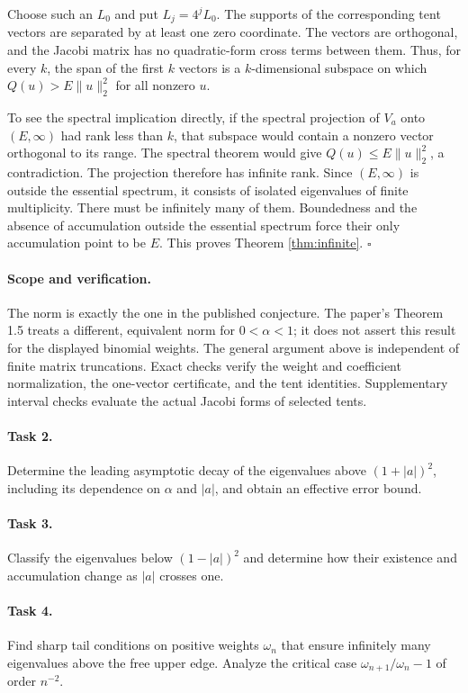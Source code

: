 \documentclass[11pt]{article}
\begin{document}
Choose such an $L_0$ and put $L_j=4^jL_0$.
The supports of the corresponding tent vectors are separated by at
least one zero coordinate. The vectors are orthogonal, and the Jacobi
matrix has no quadratic-form cross terms between them.
Thus, for every $k$, the span of the first $k$ vectors is a $k$-dimensional
subspace on which $Q(u)>E\|u\|_2^2$ for all nonzero $u$.

To see the spectral implication directly, if the spectral projection of
$V_a$ onto $(E,\infty)$ had rank less than $k$, that subspace would contain
a nonzero vector orthogonal to its range. The spectral theorem would
give $Q(u)\leq E\|u\|_2^2$, a contradiction.
The projection therefore has infinite rank. Since $(E,\infty)$ is
outside the essential spectrum, it consists of isolated eigenvalues
of finite multiplicity. There must be infinitely many of them.
Boundedness and the absence of accumulation outside the essential
spectrum force their only accumulation point to be $E$.
This proves Theorem \ref{thm:infinite}.
\hfill$\square$

\paragraph{Scope and verification.}
The norm is exactly the one in the published conjecture. The paper's
Theorem 1.5 treats a different, equivalent norm for $0<\alpha<1$;
it does not assert this result for the displayed binomial weights.
The general argument above is independent of finite matrix truncations.
Exact checks verify the weight and coefficient normalization, the
one-vector certificate, and the tent identities. Supplementary interval
checks evaluate the actual Jacobi forms of selected tents.

\paragraph{Task 2.}
Determine the leading asymptotic decay of the eigenvalues above
$(1+|a|)^2$, including its dependence on $\alpha$ and $|a|$, and obtain
an effective error bound.

\paragraph{Task 3.}
Classify the eigenvalues below $(1-|a|)^2$ and determine how their
existence and accumulation change as $|a|$ crosses one.

\paragraph{Task 4.}
Find sharp tail conditions on positive weights $\omega_n$ that ensure
infinitely many eigenvalues above the free upper edge. Analyze the
critical case $\omega_{n+1}/\omega_n-1$ of order $n^{-2}$.
\end{document}
